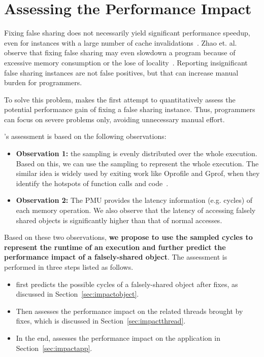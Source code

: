 \section{Assessing the Performance Impact}

\label{sec:predictimprove}
Fixing false sharing does not necessarily yield significant performance speedup, even for instances with a large number of cache invalidations~\cite{Sheriff, Predator}. Zhao et. al. observe that fixing false sharing may even slowdown a program because of excessive memory consumption or the lose of locality~\cite{qinzhao}. Reporting insignificant false sharing instances are not false positives, but that can increase manual burden for programmers.

To solve this problem, \cheetah{} makes the first attempt to quantitatively assess the potential performance gain of fixing a false sharing instance. Thus, programmers can focus on severe problems only, avoiding unnecessary manual effort.

\cheetah{}'s assessment is based on the following observations:

\begin{itemize}
\item {\bf Observation 1:} the sampling is evenly distributed over the whole execution. Based on this, we can use the sampling to represent the whole execution. The similar idea is widely used by exiting work like Oprofile and Gprof, when they identify the hotspots of function calls and code~\cite{oprofile, DBLP:conf/sigplan/GrahamKM82}.

\item {\bf Observation 2:} The PMU provides the latency information (e.g. cycles) of each memory operation. We also observe that the latency of accessing falsely shared objects is significantly higher than that of normal accesses. 

\end{itemize}

Based on these two observations, {\bf we propose to use the sampled cycles to represent the runtime of an execution and further predict the performance impact of a falsely-shared object}. The assessment is performed in three steps listed as follows. 

\begin{itemize}
\item \cheetah{} first predicts the possible cycles of a falsely-shared object after fixes, as discussed in Section~\ref{sec:impactobject}. 

\item Then \cheetah{} assesses the performance impact on the related threads brought by fixes, which is discussed in Section~\ref{sec:impactthread}. 
 
\item In the end, \cheetah{} assesses the performance impact on the application in Section~\ref{sec:impactapp}. 
\end{itemize}

